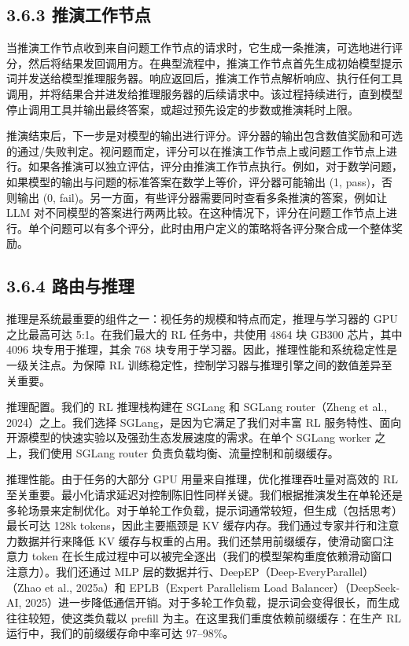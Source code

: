 \subsection{3.6.3 推演工作节点}\label{rollout-worker}

当推演工作节点收到来自问题工作节点的请求时，它生成一条推演，可选地进行评分，然后将结果发回调用方。在典型流程中，推演工作节点首先生成初始模型提示词并发送给模型推理服务器。响应返回后，推演工作节点解析响应、执行任何工具调用，并将结果合并进发给推理服务器的后续请求中。该过程持续进行，直到模型停止调用工具并输出最终答案，或超过预先设定的步数或推演耗时上限。

推演结束后，下一步是对模型的输出进行评分。评分器的输出包含数值奖励和可选的通过/失败判定。视问题而定，评分可以在推演工作节点上或问题工作节点上进行。如果各推演可以独立评估，评分由推演工作节点执行。例如，对于数学问题，如果模型的输出与问题的标准答案在数学上等价，评分器可能输出 (1, pass)，否则输出 (0, fail)。另一方面，有些评分器需要同时查看多条推演的答案，例如让 LLM 对不同模型的答案进行两两比较。在这种情况下，评分在问题工作节点上进行。单个问题可以有多个评分，此时由用户定义的策略将各评分聚合成一个整体奖励。

\subsection{3.6.4 路由与推理}\label{router-and-inference}

推理是系统最重要的组件之一：视任务的规模和特点而定，推理与学习器的 GPU 之比最高可达 5:1。在我们最大的 RL 任务中，共使用 4864 块 GB300 芯片，其中 4096 块专用于推理，其余 768 块专用于学习器。因此，推理性能和系统稳定性是一级关注点。为保障 RL 训练稳定性，控制学习器与推理引擎之间的数值差异至关重要。

推理配置。我们的 RL 推理栈构建在 SGLang 和 SGLang router（Zheng et al., 2024）之上。我们选择 SGLang，是因为它满足了我们对丰富 RL 服务特性、面向开源模型的快速实验以及强劲生态发展速度的需求。在单个 SGLang worker 之上，我们使用 SGLang router 负责负载均衡、流量控制和前缀缓存。

推理性能。由于任务的大部分 GPU 用量来自推理，优化推理吞吐量对高效的 RL 至关重要。最小化请求延迟对控制陈旧性同样关键。我们根据推演发生在单轮还是多轮场景来定制优化。对于单轮工作负载，提示词通常较短，但生成（包括思考）最长可达 128k tokens，因此主要瓶颈是 KV 缓存内存。我们通过专家并行和注意力数据并行来降低 KV 缓存与权重的占用。我们还禁用前缀缓存，使滑动窗口注意力 token 在长生成过程中可以被完全逐出（我们的模型架构重度依赖滑动窗口注意力）。我们还通过 MLP 层的数据并行、DeepEP（Deep-EveryParallel）（Zhao et al., 2025a）和 EPLB（Expert Parallelism Load Balancer）（DeepSeek-AI, 2025）进一步降低通信开销。对于多轮工作负载，提示词会变得很长，而生成往往较短，使这类负载以 prefill 为主。在这里我们重度依赖前缀缓存：在生产 RL 运行中，我们的前缀缓存命中率可达 97--98\%。



